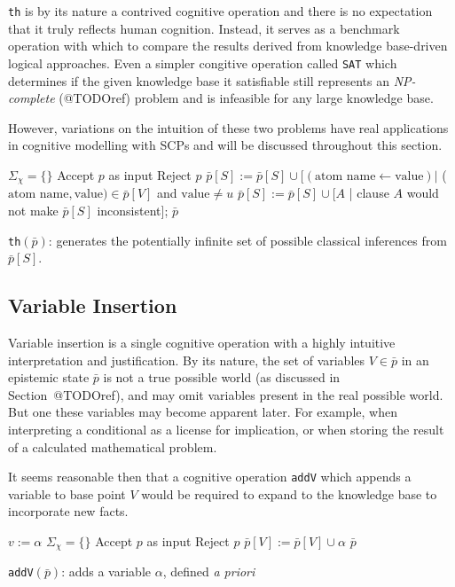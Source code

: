 \texttt{th} is by its nature a contrived cognitive operation and there is no expectation that it truly reflects human cognition. Instead, it serves as a benchmark operation with which to compare the results derived from knowledge base-driven logical approaches. Even a simpler congitive operation called \texttt{SAT} which determines if the given knowledge base it satisfiable still represents an \textit{NP-complete} (@TODOref) problem and is infeasible for any large knowledge base.

However, variations on the intuition of these two problems have real applications in cognitive modelling with SCPs and will be discussed throughout this section.

\begin{algorithm}[H] \label{cogOp:th}
\SetAlgoLined
{}
{
$\Sigma_{\chi}=\{\}$\;
{
Accept $p$ as input\;
}
{
Reject $p$\;
}
}
{
$\bar{p}[S]:=\bar{p}[S] \cup [(\text{atom name} \leftarrow \text{value}) |$ ($\text{atom name},\text{value}) \in \bar{p}[V]$ and $\text{value} \neq u$\;
$\bar{p}[S]:=\bar{p}[S] \cup [A$ | clause $A$ would not make $\bar{p}[S]$ inconsistent$]$;
\Return $\bar{p}$
}

\caption{\texttt{th}$(\bar{p})$: generates the potentially infinite set of possible classical inferences from $\bar{p}[S]$.}
\end{algorithm}


\subsection{Variable Insertion}

Variable insertion is a single cognitive operation with a highly intuitive interpretation and justification. By its nature, the set of variables $V \in \bar{p}$ in an epistemic state $\bar{p}$ is not a true possible world (as discussed in Section~@TODOref), and may omit variables present in the real possible world. But one these variables may become apparent later. For example, when interpreting a conditional as a license for implication, or when storing the result of a calculated mathematical problem.

It seems reasonable then that a cognitive operation \texttt{addV} which appends a variable to base point $V$ would be required to expand to the knowledge base to incorporate new facts.

\begin{algorithm}[H] \label{cogOp:addV}
\SetAlgoLined
{}
$v:= \alpha$\;
{
$\Sigma_{\chi}=\{\}$\;
{
Accept $p$ as input\;
}
{
Reject $p$\;
}
}
{
$\bar{p}[V]:=\bar{p}[V] \cup \alpha$\;
\Return $\bar{p}$
}

\caption{\texttt{addV}$(\bar{p})$: adds a variable $\alpha$, defined \textit{a priori}}
\end{algorithm}

